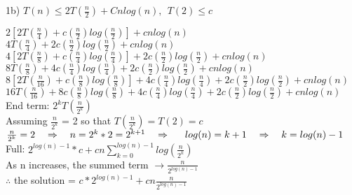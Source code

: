 \documentclass[12pt]{article}
\begin{document}
\pagebreak


\noindent 1b) $T(n) \le 2T(\frac{n}{2}) + Cnlog(n),\ \ T(2) \le c$\\

\begin{adjustwidth}{.25in}{0in}


$2[2T(\frac{n}{4})+
c(\frac{n}{2})log(\frac{n}{2})] + 
cnlog(n)$\\
\noindent
$4T(\frac{n}{4})+
2c(\frac{n}{2})log(\frac{n}{2}) + 
cnlog(n)$\\


\noindent
$4[2T(\frac{n}{8})+
c(\frac{n}{4})log(\frac{n}{4})] + 
2c(\frac{n}{2})log(\frac{n}{2}) +
cnlog(n)$\\
\noindent
$8T(\frac{n}{8})+
4c(\frac{n}{4})log(\frac{n}{4}) + 
2c(\frac{n}{2})log(\frac{n}{2}) +
cnlog(n)$\\


\noindent
$8[2T(\frac{n}{16})+
c(\frac{n}{8})log(\frac{n}{8})] + 
4c(\frac{n}{4})log(\frac{n}{4}) + 
2c(\frac{n}{2})log(\frac{n}{2}) +
cnlog(n)$\\
\noindent
$16T(\frac{n}{16})+
8c(\frac{n}{8})log(\frac{n}{8}) + 
4c(\frac{n}{4})log(\frac{n}{4}) + 
2c(\frac{n}{2})log(\frac{n}{2}) +
cnlog(n)$\\


End term: $2^kT(\frac{n}{2^k})$ \\
\indent Assuming $\frac{n}{2^k}$ = 2 so that $T(\frac{n}{2^k})=T(2) = c$\\


$\frac{n}{2^k}=2\ \ \ \Rightarrow\ \ \ 
n=2^k*2=2^{k+1}\ \ \ \Rightarrow\\
\indent log(n)=k+1\ \ \ \Rightarrow\ \ \ 
k=log(n)-1$\\


\noindent Full: $2^{log(n)-1}*c + cn \sum_{k=0}^{log(n)-1}log(\frac{n}{2^k})$\\
As n increases, the summed term $\to \frac{n}{2^{log(n)-1}}$\\
$\therefore$ the solution = $c*2^{log(n)-1} + 
cn\frac{n}{2^{log(n)-1}}$


\end{adjustwidth}





\end{document}
